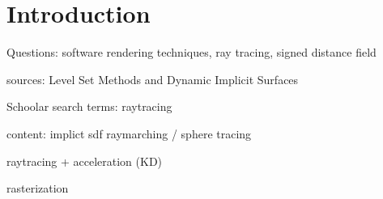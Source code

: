 \section{Introduction}
\label{section:Introduction}

Questions: software rendering techniques, ray tracing, signed distance field

sources: Level Set Methods and Dynamic Implicit Surfaces

Schoolar search terms: 
raytracing


content:
implict
sdf
raymarching / sphere tracing

raytracing + acceleration (KD)

rasterization